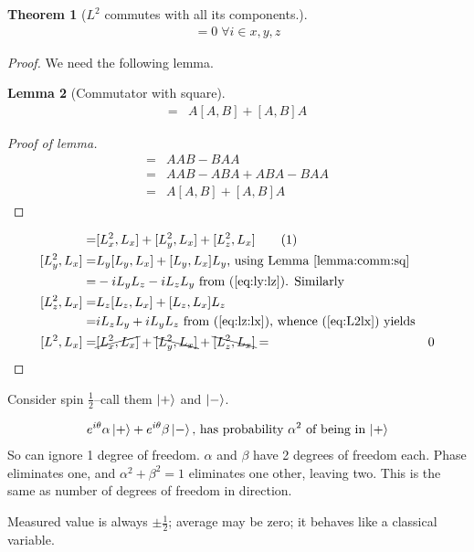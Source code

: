 \documentclass[]{article}
\newcommand\numberthis{\addtocounter{equation}{1}\tag{\theequation}}
\newtheorem{thm}{Theorem}
\newtheorem{lemma}[thm]{Lemma}
\begin{document}
\begin{thm}[$L^2$ commutes with all its components.]
	 \begin{align*}
	 [L^2,L_i]=0  \;\forall i \in {x,y,z}
	 \end{align*}
\end{thm}
\begin{proof}
	We need the following lemma.
	\begin{lemma}[Commutator with square]\label{lemma:comm:sq}
		\begin{align*}
			[A^2,B] =& A[A,B] + [A,B]A
		\end{align*}
	\end{lemma}
	\begin{proof}[Proof of lemma]
		\begin{align*}
			[A^2,B] =& AAB - BAA\\
			=& AAB - ABA +ABA -BAA\\
			=& A[A,B] + [A,B]A
		\end{align*}
	\end{proof}
	\begin{align*}
	[L^2,L_x]=&[L_x^2,L_x] + [L_y^2,L_x] + [L_z^2,L_x] \numberthis \label{eq:L2lx}\\
	[L_y^2,L_x] =&L_y[L_y,L_x] + [L_y,L_x]L_y \text{, using Lemma \ref{lemma:comm:sq}}\\
	=& -i L_y L_z -i L_z L_y \text{ from (\ref{eq:ly:lz}). Similarly}\\
	[L_z^2,L_x] = &L_z [L_z,L_x] + [L_z,L_x] L_z\\
	=& i L_z L_y  + i L_y L_z \text{ from (\ref{eq:lz:lx}), whence (\ref{eq:L2lx}) yields}\\
	[L^2,L_x]=&\cancel{[L_x^2,L_x] }+\bcancel{ [L_y^2,L_x]} + \bcancel{[L_z^2,L_x]}
	=& 0
	\end{align*}
\end{proof}
Consider spin $\frac{1}{2}$--call them $\ket{+}$ and  $\ket{-}$.

\begin{align*}
e^{i\theta} \alpha \ket{+} + e^{i\theta}\beta \ket{-} \text{, has probability $\alpha^2$ of being in $\ket{+}$}
\end{align*}
So can ignore 1 degree of freedom. $\alpha$ and $\beta$ have 2 degrees of freedom each. Phase eliminates one, and $\alpha^2+\beta^2=1$ eliminates one other, leaving two. This is the same as number of degrees of freedom in direction.

Measured value is always $\pm \frac{1}{2}$; average may be zero; it behaves like a classical variable.
\end{document}
